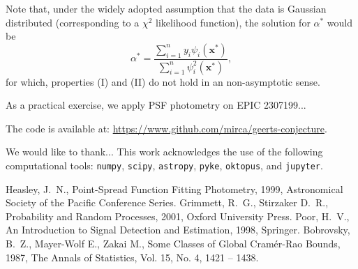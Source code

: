 \documentclass{rnaastex}
\begin{document}
Note that, under the widely adopted assumption that the data is Gaussian distributed (corresponding to a $\chi^2$ likelihood function), the solution for $\alpha^{*}$ would be
\begin{equation}
    \alpha^{*} = \dfrac{\sum_{i=1}^{n}y_i \psi_i(\bm{x}^{*})}{\sum_{i=1}^{n}\psi^2_i(\bm{x}^{*})},
\end{equation}
for which, properties (I) and (II) do not hold in an non-asymptotic sense.

As a practical exercise, we apply PSF photometry on EPIC 2307199...

The code is available at: \url{https://www.github.com/mirca/geerts-conjecture}.

\acknowledgments We would like to thank... This work acknowledges the use of the following computational tools: \texttt{numpy}\citep{}, \texttt{scipy}\citep{}, \texttt{astropy}\citep{}, \texttt{pyke}, \texttt{oktopus}\citep{}, and \texttt{jupyter}\citep{}.

\begin{thebibliography}{}
     Heasley, J.~N., Point-Spread Function Fitting Photometry, 1999, Astronomical Society of the Pacific Conference Series.
     Grimmett, R.~G., Stirzaker D.~R., Probability and Random Processes, 2001, Oxford University Press.
     Poor, H.~V., An Introduction to Signal Detection and Estimation, 1998, Springer.
     Bobrovsky, B.~Z., Mayer-Wolf E., Zakai M., Some Classes of Global Cram\'er-Rao Bounds, 1987, The Annals of Statistics, Vol. 15, No. 4, 1421 -- 1438.
\end{thebibliography}
\end{document}
